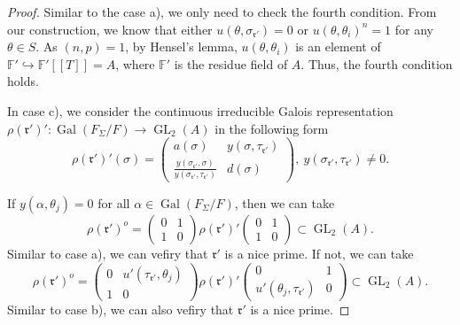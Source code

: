 \documentclass[10pt,a4paper]{amsart}
\begin{document}
\begin{proof}
		Similar to the case a), we only need to check the fourth condition. From our construction, we know that either $u(\theta, \sigma_{\mathfrak{r}'})=0$ or $u(\theta, \theta_i)^{n}=1$ for any $\theta \in S$. As $(n,p)=1$, by Hensel's lemma, $ u(\theta, \theta_{i})$ is an element of $\mathbb{F}' \hookrightarrow \mathbb{F}'[[T]]=A$, where $\mathbb{F}' $ is the residue field of $A$. Thus, the fourth condition holds.
		
		In case c), we consider the continuous irreducible Galois representation $\rho(\mathfrak{r}')' : \operatorname{Gal}(F_{\Sigma}/F) \to \operatorname{GL}_2(A)$ in the following form $$
		\rho(\mathfrak{r}')'(\sigma)=\begin{pmatrix}
			a(\sigma) & y(\sigma, \tau_{\mathfrak{r}'})\\
			\frac{y(\sigma_{\mathfrak{r}'}, \sigma)}{y(\sigma_{\mathfrak{r}'}, \tau_{\mathfrak{r}'})}& d(\sigma)
		\end{pmatrix}, ~y(\sigma_{\mathfrak{r}'}, \tau_{\mathfrak{r}'}) \ne 0.$$
		
		If $y(\alpha, \theta_j)=0$ for all $\alpha \in \operatorname{Gal}(F_\Sigma/F)$, then we can take $$
		\rho(\mathfrak{r}')^o=\begin{pmatrix}
			0 & 1\\
			1 & 0
		\end{pmatrix} \rho(\mathfrak{r}')'\begin{pmatrix}
		0 & 1\\
		1 & 0
		\end{pmatrix} \subset \operatorname{GL}_2(A). $$
		Similar to case a), we can vefiry that $\mathfrak{r}'$ is a nice prime.
		If not, we can take $$ \rho(\mathfrak{r}')^o=\begin{pmatrix}
			0 & u'(\tau_{\mathfrak{r}'}, \theta_{j})\\
			1 & 0
		\end{pmatrix} \rho(\mathfrak{r}')'\begin{pmatrix}
			0 & 1\\
			u'(\theta_{j}, \tau_{\mathfrak{r}'}) & 0
		\end{pmatrix} \subset \operatorname{GL}_2(A). $$
	Similar to case b), we can also vefiry that $\mathfrak{r}'$ is a nice prime.
	\end{proof}
\end{document}

